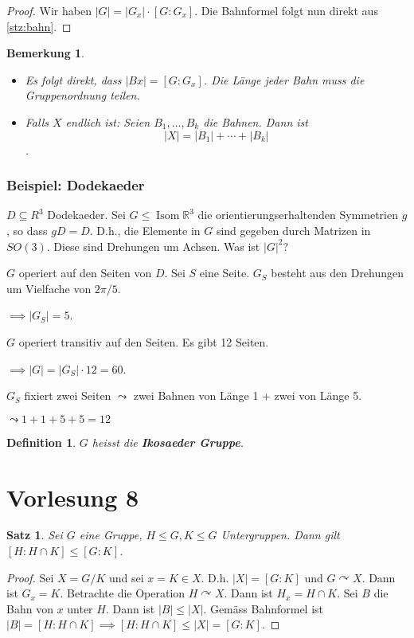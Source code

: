 \documentclass{article}
\theoremstyle{plain}
\newtheorem{definition}{Definition}
\newtheorem{theorem}{Satz}
\newtheorem{bemerkung}{Bemerkung}
\newcommand{\defn}[1]{\textbf{#1}}
\newcommand{\R}{\mathbb{R}}
\newcommand{\ug}{\leq}
\newcommand{\isom}{\mathop\text{Isom}}
\newcommand{\operateson}{\curvearrowright}
\begin{document}
\begin{proof}
    Wir haben $|G|=|G_x|\cdot [G:G_x]$.
    Die Bahnformel folgt nun direkt aus \cref{stz:bahn}.
\end{proof}
\begin{bemerkung}
\begin{itemize}
    \item Es folgt direkt, dass $|Bx|=[G:G_x]$. Die Länge jeder Bahn muss die Gruppenordnung teilen.
    \item Falls $X$ endlich ist: Seien $B_1,\ldots,B_k$ die Bahnen. Dann ist $$|X| = |B_1|+\cdots+ |B_k|$$.
\end{itemize}
\end{bemerkung}
\subsubsection*{Beispiel: Dodekaeder}
    $D\subseteq R^3 $ Dodekaeder.
    Sei $G\ug \isom{\R^3}$ die orientierungserhaltenden Symmetrien $g$, so dass $gD=D$. D.h., die Elemente in $G$ sind gegeben durch Matrizen in $SO(3)$. Diese sind Drehungen um Achsen. Was ist $|G|^2$?

    $G$ operiert auf den Seiten von $D$. Sei $S$ eine Seite. $G_S$ besteht aus den Drehungen um Vielfache von $2\pi/5$.
    
    $\implies |G_S|=5$. 

    $G$ operiert transitiv auf den Seiten. Es gibt 12 Seiten.

    $\implies |G|=|G_S|\cdot 12=60$.
    
    $G_S$ fixiert zwei Seiten $\leadsto$ zwei Bahnen von Länge 1 + zwei von Länge 5.

    $\leadsto 1+1+5+5 = 12$

\begin{definition}
    $G$ heisst die \defn{Ikosaeder Gruppe}.
\end{definition}


\section*{Vorlesung 8}
\begin{theorem}
    Sei $G$ eine Gruppe, $H\ug G, K\ug G$ Untergruppen. Dann gilt $[H:H\cap K]\ug [G:K]$.
\end{theorem}
\begin{proof}
    Sei $X=G/K$ und sei $x=K\in X$. D.h. $|X|=[G:K]$ und $G\operateson X$. Dann ist $G_x=K$.
    Betrachte die Operation $H\operateson X$. Dann ist $H_x=H\cap K$. Sei $B$ die Bahn von $x$ unter $H$. Dann ist $|B|\ug|X|$. Gemäss Bahnformel ist $|B|=[H:H\cap K] \implies [H:H\cap K]\ug |X|=[G:K]$.
\end{proof}
\end{document}
